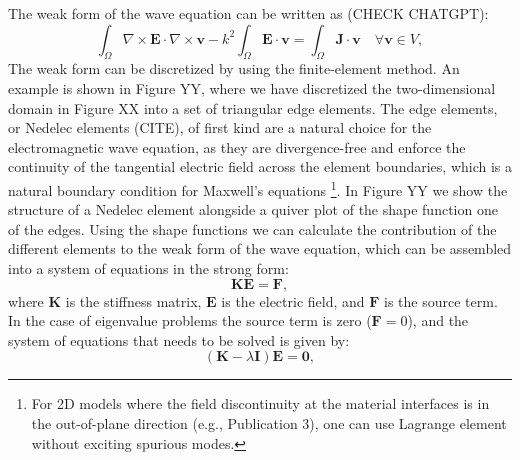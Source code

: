 The weak form of the wave equation can be written as (CHECK CHATGPT):
\begin{equation}
    \int_{\Omega} \nabla \times \mathbf{E} \cdot \nabla \times \mathbf{v} - k^2 \int_{\Omega} \mathbf{E} \cdot \mathbf{v} = \int_{\Omega} \mathbf{J} \cdot \mathbf{v} \quad \forall \mathbf{v} \in V,
\end{equation}
The weak form can be discretized by using the finite-element method. An example is shown in Figure YY, 
where we have discretized the two-dimensional domain in Figure XX into a set of triangular edge elements. 
The edge elements, or Nedelec elements (CITE), of first kind are a natural choice for the electromagnetic 
wave equation, as they are divergence-free and enforce the continuity of the tangential electric field 
across the element boundaries, which is a natural boundary condition for Maxwell's equations 
\footnote{For 2D models where the field discontinuity at the material interfaces 
is in the out-of-plane direction (e.g., Publication 3), one can use Lagrange element without 
exciting spurious modes.}. In Figure YY
we show the structure of a Nedelec element alongside a quiver plot of the shape function one of the edges.
Using the shape functions we can calculate the contribution of the different elements to the weak form of the
wave equation, which can be assembled into a system of equations in the strong form:
\begin{equation}
    \mathbf{K} \mathbf{E} = \mathbf{F},
\end{equation}
where $\mathbf{K}$ is the stiffness matrix, $\mathbf{E}$ is the electric field, and $\mathbf{F}$ is the source
 term. In the case of eigenvalue problems the source term is zero ($\mathbf{F}=0$), and the system of equations 
that needs to be solved is given by:
\begin{equation}
    \left(\mathbf{K} - \lambda \mathbf{I} \right) \mathbf{E} =  \mathbf{0},
\end{equation}

